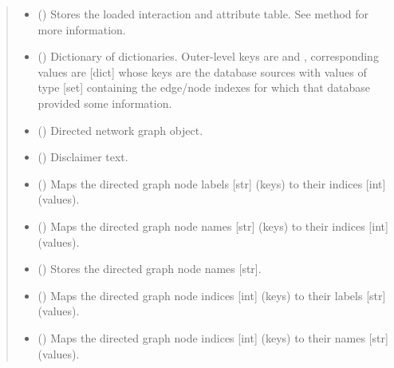 \documentclass[letterpaper,10pt,english]{sphinxmanual}
\begin{document}
\begin{fulllineitems}
\begin{quote}
\begin{description}
\begin{itemize}
\item {} 
 () \textendash{} Stores the loaded interaction and attribute table. See
{\hyperref[\detokenize{reference:pypath.main.PyPath.read_data_file}]{}} method for more information.

\item {} 
 () \textendash{} Dictionary of dictionaries. Outer-level keys are  and
, corresponding values are {[}dict{]} whose keys are the
database sources with values of type {[}set{]} containing the
edge/node indexes for which that database provided some
information.

\item {} 
 () \textendash{} Directed network graph object.

\item {} 
 () \textendash{} Disclaimer text.

\item {} 
 () \textendash{} Maps the directed graph node labels {[}str{]} (keys) to their
indices {[}int{]} (values).

\item {} 
 () \textendash{} Maps the directed graph node names {[}str{]} (keys) to their indices
{[}int{]} (values).

\item {} 
 () \textendash{} Stores the directed graph node names {[}str{]}.

\item {} 
 () \textendash{} Maps the directed graph node indices {[}int{]} (keys) to their
labels {[}str{]} (values).

\item {} 
 () \textendash{} Maps the directed graph node indices {[}int{]} (keys) to their names
{[}str{]} (values).


\end{itemize}
\end{description}
\end{quote}
\end{fulllineitems}
\end{document}
